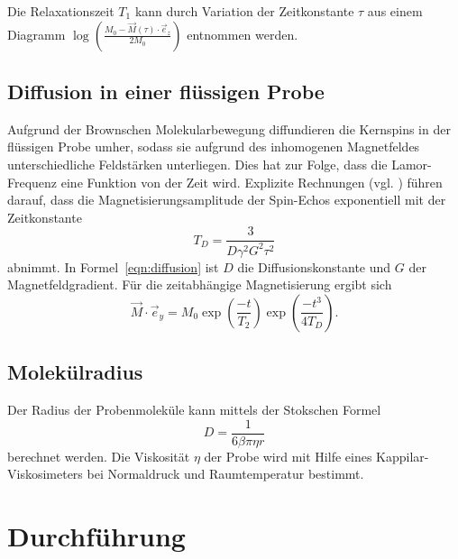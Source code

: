 Die Relaxationszeit $T_1$ kann durch Variation der Zeitkonstante $\tau$
aus einem Diagramm $\log{\left(\frac{M_0 - \vec{M}(\tau)\cdot\vec{e}_z}{2M_0}\right)}$
entnommen werden.

\subsection{Diffusion in einer flüssigen Probe}
Aufgrund der Brownschen Molekularbewegung diffundieren die
Kernspins in der flüssigen Probe umher, sodass sie aufgrund des inhomogenen
Magnetfeldes unterschiedliche Feldstärken unterliegen.
Dies hat zur Folge, dass die Lamor-Frequenz eine Funktion von der Zeit wird.
Explizite Rechnungen (vgl. \cite{anleitung}) führen darauf, dass die Magnetisierungsamplitude
der Spin-Echos exponentiell mit der Zeitkonstante
\begin{equation}
  \label{eqn:diffusion}
  T_{D} = \frac{3}{D\gamma^2G^2\tau^2}
\end{equation}
abnimmt.
In Formel~\eqref{eqn:diffusion} ist $D$ die Diffusionskonstante und $G$
der Magnetfeldgradient.
Für die zeitabhängige Magnetisierung ergibt sich
\begin{equation}
  \label{eqn:mag_diffusion}
  \vec{M}\cdot\vec{e}_y = M_0\exp{\left(\frac{-t}{T_2}\right)}\exp{\left(\frac{-t^3}{4T_{D}}\right)}.
\end{equation}

\subsection{Molekülradius}
Der Radius der Probenmoleküle kann mittels der Stokschen Formel
\begin{equation}
  \label{eqn:diffkonst}
  D = \frac{1}{6\beta\pi\eta r}
\end{equation}
berechnet werden. Die Viskosität $\eta$ der Probe wird mit Hilfe eines Kappilar-Viskosimeters
bei Normaldruck und Raumtemperatur bestimmt.

\section{Durchführung}
